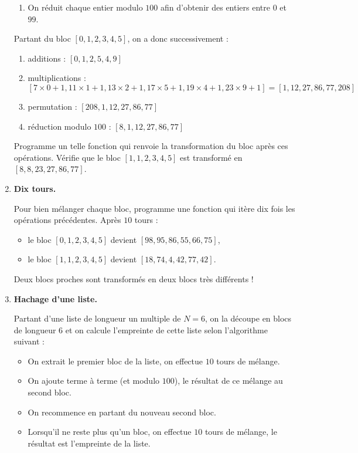 \documentclass[11pt,class=report,crop=false]{standalone}
\begin{document}
\begin{activite}
\begin{enumerate}
\begin{enumerate}
    \item On réduit chaque entier modulo $100$ afin d'obtenir des entiers entre $0$ et $99$.
  \end{enumerate}



  
  Partant du bloc $[0, 1, 2, 3, 4, 5]$, on a donc successivement :
   \begin{enumerate}
    \item additions : $[0, 1, 2, 5, 4, 9]$
    
    \item multiplications : $[7\times 0 + 1, 11\times 1+1, 13\times 2+1, 17 \times 5+1,19 \times  4+1, 23 \times 9+1] = [1,12,27,86,77,208]$ 
    
    \item permutation : $[208,1,12,27,86,77]$
    
    \item réduction modulo $100$ : $[8,1,12,27,86,77]$
  \end{enumerate}
  
  Programme un telle fonction  qui renvoie la transformation du bloc après ces opérations. Vérifie que le bloc $[1, 1, 2, 3, 4, 5]$ est transformé en $[8, 8, 23, 27, 86, 77]$.
 
    \item \textbf{Dix tours.} 
    
    Pour bien mélanger chaque bloc, programme une fonction   qui itère dix fois les opérations précédentes.
    Après $10$ tours :
    \begin{itemize}
      \item le bloc $[0, 1, 2, 3, 4, 5]$ devient $[98, 95, 86, 55, 66, 75]$,
      \item le bloc $[1, 1, 2, 3, 4, 5]$ devient $[18, 74, 4, 42, 77, 42]$.
    \end{itemize}
 Deux blocs proches sont transformés en deux blocs très différents ! 
   
   \item \textbf{Hachage d'une liste.} 
   
   Partant d'une liste de longueur un multiple de $N=6$, on la découpe en blocs de longueur $6$ et on calcule l'empreinte de cette liste selon l'algorithme suivant :
   \begin{itemize}
     \item On extrait le premier bloc de la liste, on effectue $10$ tours de mélange.
     \item On ajoute terme à terme (et modulo $100$), le résultat de ce mélange au second bloc.
     \item On recommence en partant du nouveau second bloc.
     \item Lorsqu'il ne reste plus qu'un bloc, on effectue $10$ tours de mélange, le résultat est l'empreinte de la liste.
   \end{itemize}
 

\end{enumerate}
\end{activite}
\end{document}
